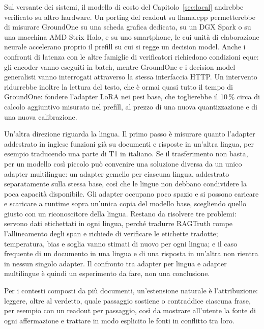 Sul versante dei sistemi, il modello di costo del Capitolo~\ref{sec:local} andrebbe verificato su altro hardware. Un
porting del readout su llama.cpp permetterebbe di misurare GroundOne su una scheda grafica dedicata, su un DGX Spark o
su una macchina AMD Strix Halo, e su uno smartphone, le cui unità di elaborazione neurale accelerano proprio il prefill
su cui si regge un decision model. Anche i confronti di latenza con le altre famiglie di verificatori richiedono condizioni eque: gli encoder
vanno eseguiti in batch, mentre GroundOne e i decision model generalisti vanno interrogati attraverso la stessa interfaccia
HTTP. Un intervento ridurrebbe inoltre la lettura del testo, che è ormai quasi tutto il tempo di GroundOne: fondere l'adapter LoRA nei pesi base, che toglierebbe il 10\,\% circa di calcolo aggiuntivo misurato nel prefill, al prezzo di una nuova quantizzazione e di una nuova calibrazione.

Un'altra direzione riguarda la lingua. Il primo passo è misurare quanto l'adapter addestrato in inglese funzioni già
su documenti e risposte in un'altra lingua, per esempio traducendo una parte di T1 in italiano. Se il trasferimento non
basta, per un modello così piccolo può convenire una soluzione diversa da un unico adapter multilingue: un adapter
gemello per ciascuna lingua, addestrato separatamente sulla stessa base, così che le lingue non debbano condividere la
poca capacità disponibile. Gli adapter occupano poco spazio e si possono caricare e scaricare a runtime sopra un'unica
copia del modello base, scegliendo quello giusto con un riconoscitore della lingua. Restano da risolvere tre problemi:
servono dati etichettati in ogni lingua, perché tradurre RAGTruth rompe l'allineamento degli span e richiede di
verificare le etichette tradotte; temperatura, bias e soglia vanno stimati di nuovo per ogni lingua; e il caso frequente
di un documento in una lingua e di una risposta in un'altra non rientra in nessun singolo adapter. Il confronto tra
adapter per lingua e adapter multilingue è quindi un esperimento da fare, non una conclusione.

Per i contesti composti da più documenti, un'estensione naturale è l'attribuzione: leggere, oltre al verdetto, quale
passaggio sostiene o contraddice ciascuna frase, per esempio con un readout per passaggio, così da mostrare all'utente
la fonte di ogni affermazione e trattare in modo esplicito le fonti in conflitto tra loro.


